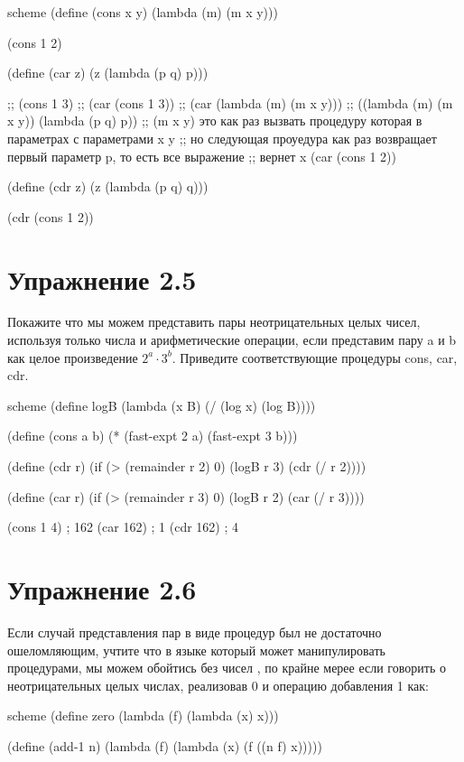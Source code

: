 \begin{codelisting}{scheme}
(define (cons x y)
  (lambda (m) (m x y)))

(cons 1 2)

(define (car z)
  (z (lambda (p q) p)))

;; (cons 1 3)
;; (car (cons 1 3))
;; (car (lambda (m) (m x y)))
;; ((lambda (m) (m x y)) (lambda (p q) p))
;; (m x y) это как раз вызвать процедуру которая в параметрах с параметрами x y
;; но следующая проуедура как раз возвращает первый параметр p, то есть все выражение
;; вернет x
(car (cons 1 2))

(define (cdr z)
  (z (lambda (p q) q)))

(cdr (cons 1 2))
\end{codelisting}


\chapter{Упражнение 2.5}

Покажите что мы можем представить пары неотрицательных целых чисел, используя только числа и арифметические операции, если представим пару a и b как целое произведение $2^a\cdot 3^b$. Приведите соответствующие процедуры cons, car, cdr.


\begin{codelisting}{scheme}
(define logB
    (lambda (x B)
      (/ (log x) (log B))))

(define (cons a b)
  (* (fast-expt 2 a) (fast-expt 3 b)))

(define (cdr r)
  (if (> (remainder r 2) 0)
      (logB r 3)
      (cdr (/ r 2))))

(define (car r)
  (if (> (remainder r 3) 0)
      (logB r 2)
      (car (/ r 3))))

(cons 1 4) ; 162
(car 162) ; 1
(cdr 162) ; 4
\end{codelisting}


\chapter{Упражнение 2.6}

Если случай представления пар в виде процедур был не достаточно ошеломляющим, учтите что в языке который может манипулировать процедурами, мы можем обойтись без чисел , по крайне мерее если говорить о неотрицательных целых числах, реализовав 0 и операцию добавления 1 как:

\begin{codelisting}{scheme}
(define zero (lambda (f) (lambda (x) x)))

(define (add-1 n)
  (lambda (f) (lambda (x) (f ((n f) x)))))
\end{codelisting}

